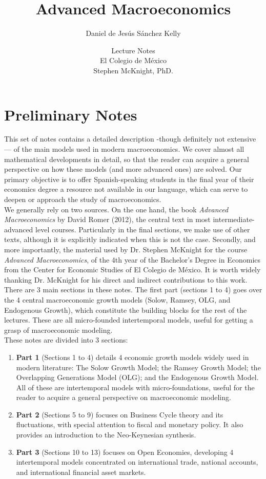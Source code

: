 \documentclass[12pt]{report}
\author{Daniel de Jesús Sánchez Kelly}
\title{\bf Advanced Macroeconomics}
\date{Lecture Notes \\ El Colegio de México \\ \bigskip Stephen McKnight, PhD.}
\begin{document}
\maketitle
\tableofcontents
\pagebreak

\chapter*{Preliminary Notes}

This set of notes contains a detailed description -though definitely not extensive— of the main models used in modern macroeconomics. We cover almost all mathematical developments in detail, so that the reader can acquire a general perspective on how these models (and more advanced ones) are solved. Our primary objective is to offer Spanish-speaking students in the final year of their economics degree a resource not available in our language, which can serve to deepen or approach the study of macroeconomics. \\

We generally rely on two sources. On the one hand, the book \textit{Advanced Macroeconomics} by David Romer (2012), the central text in most intermediate-advanced level courses. Particularly in the final sections, we make use of other texts, although it is explicitly indicated when this is not the case. Secondly, and more importantly, the material used by Dr. Stephen McKnight for the course \textit{Advanced Macroeconomics}, of the 4th year of the Bachelor's Degree in Economics from the Center for Economic Studies of El Colegio de México. It is worth widely thanking Dr. McKnight for his direct and indirect contributions to this work. \\

There are 3 main sections in these notes. The first part (sections 1 to 4) goes over the 4 central macroeconomic growth models (Solow, Ramsey, OLG, and Endogenous Growth), which constitute the building blocks for the rest of the lectures. These are all micro-founded intertemporal models, useful for getting a grasp of macroeconomic modeling. \\

These notes are divided into 3 sections:
\begin{enumerate}
\item \textbf{Part 1} (Sections 1 to 4) details 4 economic growth models widely used in modern literature: The Solow Growth Model; the Ramsey Growth Model; the Overlapping Generations Model (OLG); and the Endogenous Growth Model. All of these are intertemporal models with micro-foundations, useful for the reader to acquire a general perspective on macroeconomic modeling.
\item \textbf{Part 2} (Sections 5 to 9) focuses on Business Cycle theory and its fluctuations, with special attention to fiscal and monetary policy. It also provides an introduction to the Neo-Keynesian synthesis.
\item \textbf{Part 3} (Sections 10 to 13) focuses on Open Economies, developing 4 intertemporal models concentrated on international trade, national accounts, and international financial asset markets.
\end{enumerate}
\end{document}

